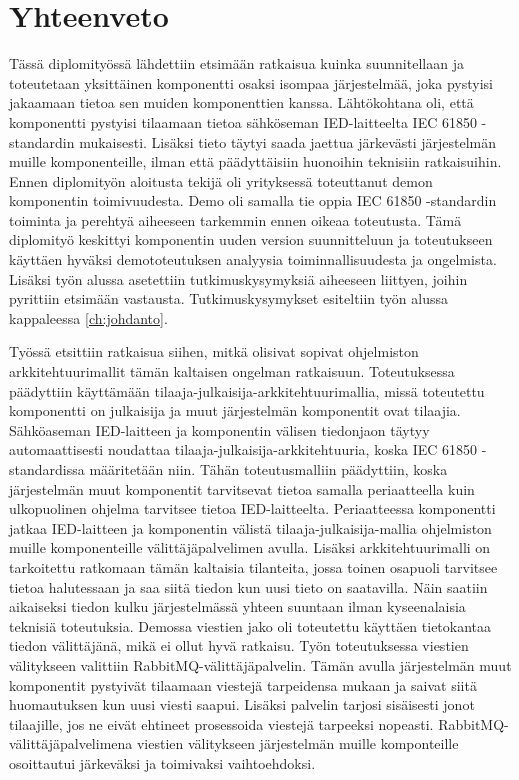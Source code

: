 \chapter{Yhteenveto}
\label{ch:yhteenveto}
Tässä diplomityössä lähdettiin etsimään ratkaisua kuinka suunnitellaan ja toteutetaan yksittäinen komponentti osaksi isompaa järjestelmää, joka pystyisi jakaamaan tietoa sen muiden komponenttien kanssa. Lähtökohtana oli, että komponentti pystyisi tilaamaan tietoa sähköseman IED-laitteelta IEC 61850 -standardin mukaisesti. Lisäksi tieto täytyi saada jaettua järkevästi järjestelmän muille komponenteille, ilman että päädyttäisiin huonoihin teknisiin ratkaisuihin. Ennen diplomityön aloitusta tekijä oli yrityksessä toteuttanut demon komponentin toimivuudesta. Demo oli samalla tie oppia IEC 61850 -standardin toiminta ja perehtyä aiheeseen tarkemmin ennen oikeaa toteutusta. Tämä diplomityö keskittyi komponentin uuden version suunnitteluun ja toteutukseen käyttäen hyväksi demototeutuksen analyysia toiminnallisuudesta ja ongelmista. Lisäksi työn alussa asetettiin tutkimuskysymyksiä aiheeseen liittyen, joihin pyrittiin etsimään vastausta. Tutkimuskysymykset esiteltiin työn alussa kappaleessa \ref{ch:johdanto}.

Työssä etsittiin ratkaisua siihen, mitkä olisivat sopivat ohjelmiston arkkitehtuurimallit tämän kaltaisen ongelman ratkaisuun. Toteutuksessa päädyttiin käyttämään tilaaja-julkaisija-arkkitehtuurimallia, missä toteutettu komponentti on julkaisija ja muut järjestelmän komponentit ovat tilaajia. Sähköaseman IED-laitteen ja komponentin välisen tiedonjaon täytyy automaattisesti noudattaa tilaaja-julkaisija-arkkitehtuuria, koska IEC 61850 -stan\-dar\-dis\-sa määritetään niin. Tähän toteutusmalliin päädyttiin, koska järjestelmän muut komponentit tarvitsevat tietoa samalla periaatteella kuin ulkopuolinen ohjelma tarvitsee tietoa IED-laitteelta. Periaatteessa komponentti jatkaa IED-laitteen ja komponentin välistä tilaaja-julkaisija-mallia ohjelmiston muille komponenteille välittäjäpalvelimen avulla. Lisäksi arkkitehtuurimalli on tarkoitettu ratkomaan tämän kaltaisia tilanteita, jossa toinen osapuoli tarvitsee tietoa halutessaan ja saa siitä tiedon kun uusi tieto on saatavilla. Näin saatiin aikaiseksi tiedon kulku järjestelmässä yhteen suuntaan ilman kyseenalaisia teknisiä toteutuksia. Demossa viestien jako oli toteutettu käyttäen tietokantaa tiedon välittäjänä, mikä ei ollut hyvä ratkaisu. Työn toteutuksessa viestien välitykseen valittiin RabbitMQ-välittäjäpalvelin. Tämän avulla järjestelmän muut komponentit pystyivät tilaamaan viestejä tarpeidensa mukaan ja saivat siitä huomautuksen kun uusi viesti saapui. Lisäksi palvelin tarjosi sisäisesti jonot tilaajille, jos ne eivät ehtineet prosessoida viestejä tarpeeksi nopeasti. RabbitMQ-välittäjäpalvelimena viestien välitykseen järjestelmän muille komponteille osoittautui järkeväksi ja toimivaksi vaihtoehdoksi.

